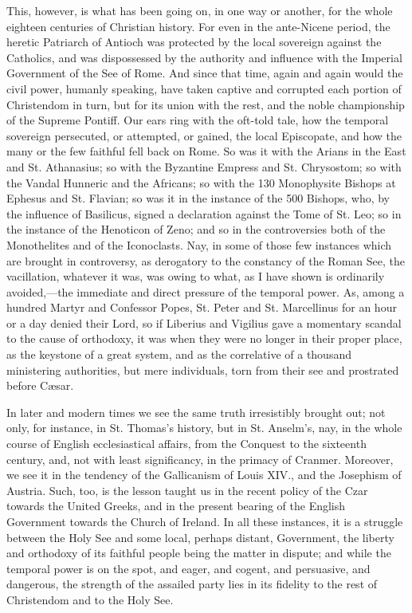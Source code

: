 This, however, is what has been going on, in one way or another,
for the whole eighteen centuries of Christian history. For even in the
ante-Nicene period, the heretic Patriarch of Antioch was protected by
the local sovereign against the Catholics, and was dispossessed by the
authority and influence with the Imperial Government of the See of
Rome. And since that time, again and again would the civil power,
humanly speaking, have taken captive and corrupted each portion of
Christendom in turn, but for its union with the rest, and the noble
championship of the Supreme Pontiff. Our ears ring with the oft-told
tale, how the temporal sovereign persecuted, or attempted, or gained,
the local Episcopate, and how the many or the few faithful fell back
on Rome. So was it with the Arians in the East and St. Athanasius; so
with the Byzantine Empress and St. Chrysostom; so with the Vandal
Hunneric and the Africans; so with the 130 Monophysite Bishops at
Ephesus and St. Flavian; so was it in the instance of the 500 Bishops,
who, by the influence of Basilicus, signed a declaration against the
Tome of St. Leo; so in the instance of the Henoticon of Zeno; and so
in the controversies both of the Monothelites and of the Iconoclasts.
Nay, in some of those few instances which are brought in controversy,
as derogatory to the constancy of the Roman See, the vacillation,
whatever it was, was owing to what, as I have shown is ordinarily
avoided,—the immediate and direct pressure of the temporal power.
As, among a hundred Martyr and Confessor Popes, St. Peter and St.
Marcellinus for an hour or a day denied their Lord, so if Liberius and
Vigilius gave a momentary scandal to the cause of orthodoxy, it was
when they were no longer in their proper place, as the keystone of a
great system, and as the correlative of a thousand ministering
authorities, but mere individuals, torn from their see and prostrated
before Cæsar.

In later and modern times we see the same truth irresistibly
brought out; not only, for instance, in St. Thomas's history, but in
St. Anselm's, nay, in the whole course of English ecclesiastical
affairs, from the Conquest to the sixteenth century, and, not with
least significancy, in the primacy of Cranmer. Moreover, we see it in
the tendency of the Gallicanism of Louis XIV., and the Josephism of
Austria. Such, too, is the lesson taught us in the recent policy of
the Czar towards the United Greeks, and in the present bearing of the
English Government towards the Church of Ireland. In all these
instances, it is a struggle between the Holy See and some local,
perhaps distant, Government, the liberty and orthodoxy of its faithful
people being the matter in dispute; and while the temporal power is on
the spot, and eager, and cogent, and persuasive, and dangerous, the
strength of the assailed party lies in its fidelity to the rest of
Christendom and to the Holy See.

